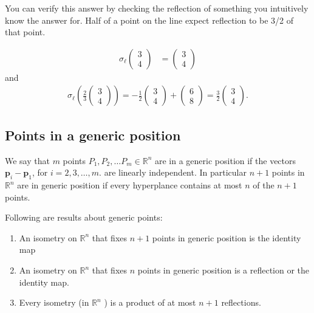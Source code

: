 You can verify this answer by checking the reflection of something you intuitively know the answer for. 
Half of a point on the line expect reflection to be 3/2 of that point.

\begin{align*}
  \sigma_{\ell} \begin{pmatrix} 3 \\ 4 \end{pmatrix} &= \begin{pmatrix} 3 \\ 4 \end{pmatrix}  
\end{align*}
and
\begin{align*}
  \sigma_{\ell} \left( \frac{2}{3} \begin{pmatrix} 3 \\ 4 \end{pmatrix}  \right) = -\frac{1}{2} \begin{pmatrix} 3 \\ 4 \end{pmatrix} + \begin{pmatrix} 6 \\ 8 \end{pmatrix} = \frac{3}{2} \begin{pmatrix} 3 \\ 4 \end{pmatrix}
.\end{align*}

\subsection{Points in a generic position}

\begin{definition}
 We say that \( m \) points \( P_1, P_2, \ldots P_m \in \mathbb{R}^{n} \)  are
 in a generic position if the vectors \( \mathbf{p}_i - \mathbf{p}_1 \),
  for \( i =2, 3, \ldots , m \). are linearly independent.
  In particular \( n + 1 \) points in \( \mathbb{R}^{n} \) are in
  generic position if every hyperplance contains at most \( n \)
  of the \( n + 1 \) points.
\end{definition}

\begin{theorem}
  Following are results about generic points:
  \begin{enumerate}
    \item An isometry on \( \mathbb{R}^{n} \) that fixes \( n + 1 \) points in generic position is
  the identity map
  \item An isometry on \( \mathbb{R}^{n} \) that fixes \( n \) points in generic position
  is a reflection or the identity map.
   \item Every isometry (in \( \mathbb{R}^{n} \) ) is a product of at most \( n + 1 \) reflections.
  \end{enumerate}
\end{theorem}

